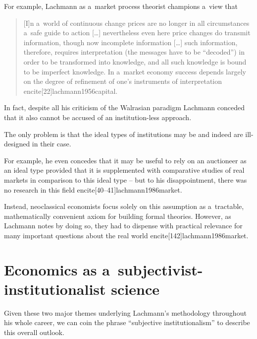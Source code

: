 {For example, Lachmann as a~market process theorist champions a~view that

\begin{quote}

[I]n a~world of continuous change prices are no longer in all circumstances a~safe guide to action [\ldots] nevertheless even here price changes do transmit information, though now incomplete information [\ldots] such information, therefore, requires interpretation (the messages have to be ``decoded'') in order to be transformed into knowledge, and all such knowledge is bound to be imperfect knowledge. In a~market economy success depends largely on the degree of refinement of one's instruments of interpretation encite[22]{lachmann1956capital}.

\end{quote}



In fact, despite all his criticism of the Walrasian paradigm Lachmann conceded that it also cannot be accused of an institution-less approach.

The only problem is that the ideal types of institutions may be and indeed are ill-designed in their case.

For example, he even concedes that it may be useful to rely on an auctioneer as an ideal type provided that it is supplemented with comparative studies of real markets in comparison to this ideal type -- but to his disappointment, there was no research in this field encite[40--41]{lachmann1986market}.

Instead, neoclassical economists focus solely on this assumption as a~tractable, mathematically convenient axiom for building formal theories. However, as Lachmann notes by doing so, they had to dispense with practical relevance for many important questions about the real world encite[142]{lachmann1986market}.



\section{Economics as a~subjectivist-institutionalist science}

\label{sec:inspirations}



Given these two major themes underlying Lachmann's methodology throughout his whole career, we can coin the phrase ``subjective institutionalism'' to describe this overall outlook.

}
